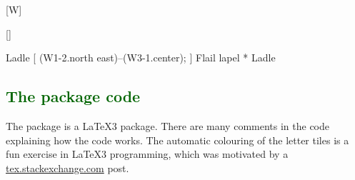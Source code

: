 \documentclass[svgnames]{report}
\newcommand\Section[1]{\subsection{\textcolor{DarkGreen}{#1}}}
\begin{document}
  [W]

  []

  \begin{example}
    \begin{wordle}[border=red, rows=4, case sensitive]{Ladle}
      [{
        (W1-2.north east)--(W3-1.center);
      }]
      Flail lapel * Ladle
    \end{wordle}
  \end{example}


  \Section{The package code}

  The  package is a \LaTeX3 package. There are many
  comments in the code explaining how the code works. The automatic
  colouring of the letter tiles is a fun exercise in \LaTeX3
  programming, which was motivated by a
  \href{https://tex.stackexchange.com/questions/659860/wordle-like-colored-letter-boxes-in-latex/660056#660056}{tex.stackexchange.com} post.

  \printindex
\end{document}
